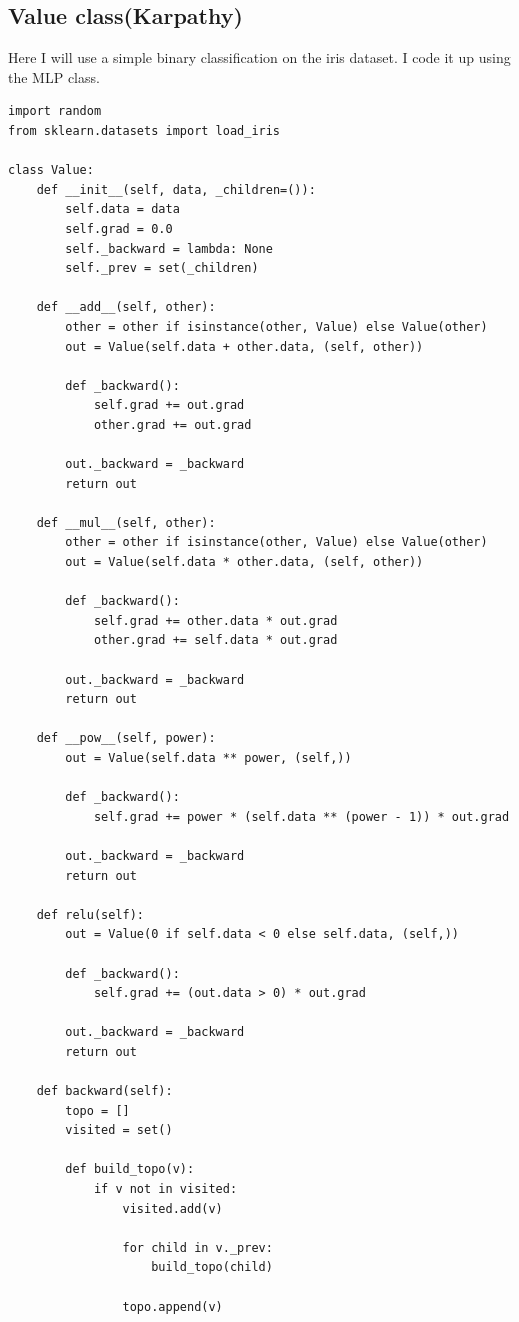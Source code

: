 \documentclass[12pt]{article}
\begin{document}
\subsection{Value class(Karpathy)}
Here I will use a simple binary classification on the iris dataset. I code it up using the MLP class.
\begin{lstlisting}
import random
from sklearn.datasets import load_iris

class Value:
    def __init__(self, data, _children=()):
        self.data = data
        self.grad = 0.0
        self._backward = lambda: None
        self._prev = set(_children)

    def __add__(self, other):
        other = other if isinstance(other, Value) else Value(other)
        out = Value(self.data + other.data, (self, other))

        def _backward():
            self.grad += out.grad
            other.grad += out.grad

        out._backward = _backward
        return out

    def __mul__(self, other):
        other = other if isinstance(other, Value) else Value(other)
        out = Value(self.data * other.data, (self, other))

        def _backward():
            self.grad += other.data * out.grad
            other.grad += self.data * out.grad

        out._backward = _backward
        return out

    def __pow__(self, power):
        out = Value(self.data ** power, (self,))

        def _backward():
            self.grad += power * (self.data ** (power - 1)) * out.grad

        out._backward = _backward
        return out

    def relu(self):
        out = Value(0 if self.data < 0 else self.data, (self,))

        def _backward():
            self.grad += (out.data > 0) * out.grad

        out._backward = _backward
        return out

    def backward(self):
        topo = []
        visited = set()

        def build_topo(v):
            if v not in visited:
                visited.add(v)

                for child in v._prev:
                    build_topo(child)

                topo.append(v)


\end{lstlisting}
\end{document}
